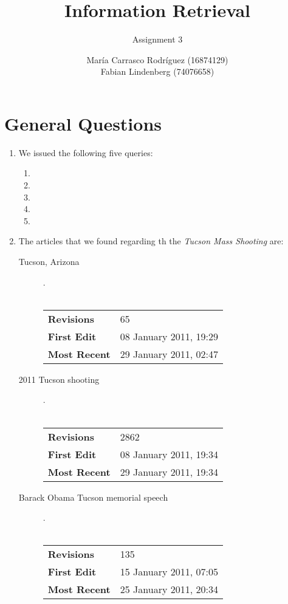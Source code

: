 \documentclass[a4paper,11pt,oneside]{book}
\title{Information Retrieval }
\subtitle{Assignment 3}
\author{ María Carrasco Rodríguez (16874129) \\
		Fabian Lindenberg (74076658)}
\begin{document}
\kostspieligmaketitle

\tableofcontents
\pagebreak

\chapter{General Questions}

\begin{enumerate}\item We issued the following five queries:
		\begin{enumerate}
			\renewcommand{\labelenumii}{\Roman{enumii}}
			\item \texttt{}
			\item \texttt{}
			\item \texttt{}
			\item \texttt{}
			\item \texttt{}
		\end{enumerate}

	\item The articles that we found regarding th the {\it Tucson Mass Shooting} are:

		\begin{description}
		\item [Tucson, Arizona] .\\\\
			\begin{tabular}{| l || l | }	\hline
			  {\bf Revisions} & 65 \\ 
			  {\bf First Edit} & 08 January 2011, 19:29 \\
			  {\bf Most Recent} & 29 January 2011, 02:47  \\\hline
			\end{tabular}
		\item [2011 Tucson shooting] .\\ \\
			\begin{tabular}{| l || l | } \hline
			  {\bf Revisions} & 2862 \\
			  {\bf First Edit} & 08 January 2011, 19:34 \\
			  {\bf Most Recent} & 29 January 2011, 19:34  \\	\hline
			\end{tabular}
		\item[Barack Obama Tucson memorial speech].\\\\
			\begin{tabular}{| l || l | } \hline
			  {\bf Revisions} & 135\\
			  {\bf First Edit} & 15 January 2011, 07:05\\
			  {\bf Most Recent} & 25 January 2011, 20:34  \\	\hline
			\end{tabular}


\end{description}
\end{enumerate}
\end{document}
